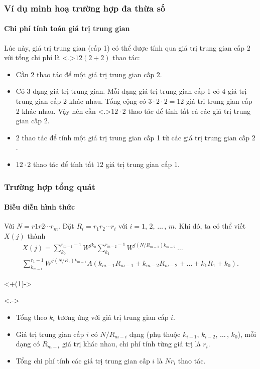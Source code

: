 \begin{frame}
  \frametitle{Ví dụ minh hoạ trường hợp đa thừa số}
  \framesubtitle{Chi phí tính toán giá trị trung gian}

  Lúc này, giá trị trung gian (cấp 1) có thể được tính qua giá trị trung gian
  cấp 2 với tổng chi phí là \alert<.>{$12(2 + 2)$ thao tác}:
  \onslide<+->
  \begin{itemize}[<+->]
    \item Cần $2$ thao tác để một giá trị trung gian cấp 2.
    \item Có 3 dạng giá trị trung gian. Mỗi dạng giá trị trung gian cấp 1 có
      $4$ giá trị trung gian cấp 2 khác nhau. Tổng cộng có $3 \cdot 2 \cdot 2 =
      12$ giá trị trung gian cấp 2 khác nhau. Vậy nên cần \alert<.>{$12 \cdot
      2$} thao tác để tính tất cả các giá trị trung gian cấp 2.
    \item $2$ thao tác để tính một giá trị trung gian cấp 1 từ các giá trị
      trung gian cấp $2$.
    \item $12\cdot 2$ thao tác để tính tất $12$ giá trị trung gian cấp 1.
  \end{itemize}
\end{frame}

\begin{frame}
  \frametitle{Trường hợp tổng quát}
  \framesubtitle{Biễu diễn hình thức}

  Với $N = r1r2\dotsm r_m$. Đặt $R_i = r_1r_2\dotsm r_{i}$ với $i = 1$, $2$,
  $\ldots\,$, $m$. Khi đó, ta có thể viết $X(j)$ thành
  \begin{multline*}
    X(j) = \sum_{k_0}^{r_{m - 1} - 1} W^{j k_0}
    \sum_{k_1}^{r_{m - 2} - 1} W^{j (N / R_{m - 1}) k_{m
    - 2}}\, \dots\, \\
    \sum_{k_{m - 1}}^{r_1 - 1} W^{j (N / R_1) k_{m - 1}} A(k_{m - 1}R_{m - 1} +
    k_{m - 2}R_{m - 2} + \dots + k_1R_1 + k_0).
  \end{multline*}

  \onslide<+(1)->
  \begin{rem}<.->
    \begin{itemize}[<+->]
      \item Tổng theo $k_i$ tương ứng với giá trị trung gian cấp $i$.
      \item Giá trị trung gian cấp $i$ có $N/R_{m - i}$ dạng (phụ thuộc $k_{i -
        1}$, $k_{i - 2}$, $\ldots\,$, $k_0$), mỗi dạng có $R_{m - i}$ giá trị
        khác nhau, chi phí tính từng giá trị là $r_i$.
      \item Tổng chi phí tính các giá trị trung gian cấp $i$ là $Nr_i$ thao
        tác.
    \end{itemize}
  \end{rem}

\end{frame}

